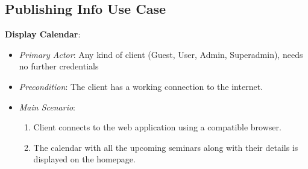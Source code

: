 \documentclass{article}
\begin{document}
\subsection{Publishing Info Use Case}
\textbf{Display Calendar}:
\label{ucdisplaycalendar}
\begin{itemize}
    \item \textit{Primary Actor}: Any kind of client (Guest, User, Admin, Superadmin), needs no further credentials %
    \item \textit{Precondition}: The client has a working connection to the internet.
    \item \textit{Main Scenario}: 
    \begin{enumerate}
        \item Client connects to the web application using a compatible browser.
        \item The calendar with all the upcoming seminars along with their details is displayed on the homepage.
        
    \end{enumerate}
    
\end{itemize}

\end{document}
